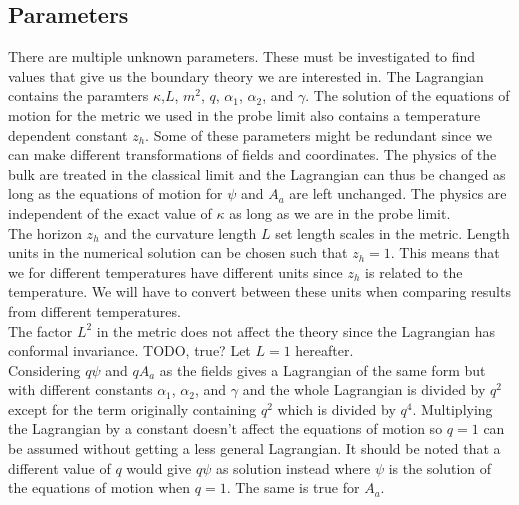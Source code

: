 \documentclass[12pt]{article}
\begin{document}
\subsection{Parameters}
There are multiple unknown parameters. These must be investigated to find values that give us the boundary theory we are interested in. The Lagrangian contains the paramters $\kappa$,$ L$, $m^2$, $q$, $\alpha_1$, $\alpha_2$, and $\gamma$. The solution of the equations of motion for the metric we used in the probe limit also contains a temperature dependent constant $z_h$. Some of these parameters might be redundant since we can make different transformations of fields and coordinates. The physics of the bulk are treated in the classical limit and the Lagrangian can thus be changed as long as the equations of motion for $\psi$ and $A_a$ are left unchanged. The physics are independent of the exact value of $\kappa$ as long as we are in the probe limit.\\

The horizon $z_h$ and the curvature length $L$ set length scales in the metric. Length units in the numerical solution can be chosen such that $z_h=1$. This means that we for different temperatures have different units since $z_h$ is related to the temperature. We will have to convert between these units when comparing results from different temperatures.\\

The factor $L^2$ in the metric does not affect the theory since the Lagrangian has conformal invariance. TODO, true? Let $L=1$ hereafter.\\

Considering $q\psi$ and $qA_a$ as the fields gives a Lagrangian of the same form but with different constants $\alpha_1$, $\alpha_2$, and $\gamma$ and the whole Lagrangian is divided by $q^2$ except for the term originally containing $q^2$ which is divided by $q^4$. Multiplying the Lagrangian by a constant doesn't affect the equations of motion so $q=1$ can be assumed without getting a less general Lagrangian. It should be noted that a different value of $q$ would give $q\psi$ as solution instead where $\psi$ is the solution of the equations of motion when $q=1$. The same is true for $A_a$.\\
\end{document}
